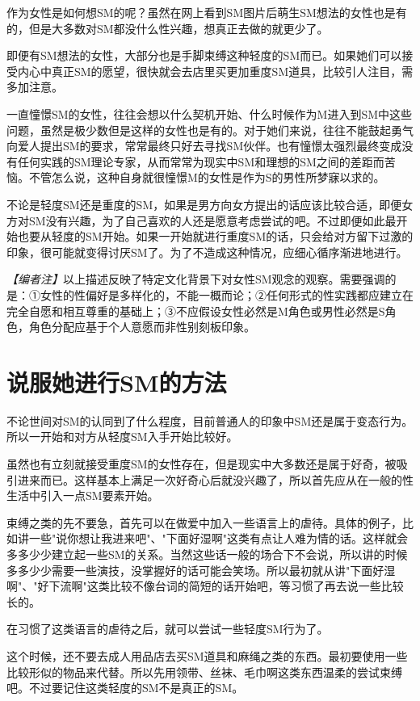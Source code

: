 \documentclass[12pt,UTF8]{ctexbook}
\begin{document}
作为女性是如何想SM的呢？虽然在网上看到SM图片后萌生SM想法的女性也是有的，但是大多数对SM都没什么性兴趣，想真正去做的就更少了。

即便有SM想法的女性，大部分也是手脚束缚这种轻度的SM而已。如果她们可以接受内心中真正SM的愿望，很快就会去店里买更加重度SM道具，比较引人注目，需多加注意。

一直憧憬SM的女性，往往会想以什么契机开始、什么时候作为M进入到SM中这些问题，虽然是极少数但是这样的女性也是有的。对于她们来说，往往不能鼓起勇气向爱人提出SM的要求，常常最终只好去寻找SM伙伴。也有憧憬太强烈最终变成没有任何实践的SM理论专家，从而常常为现实中SM和理想的SM之间的差距而苦恼。不管怎么说，这种自身就很憧憬M的女性是作为S的男性所梦寐以求的。

不论是轻度SM还是重度的SM，如果是男方向女方提出的话应该比较合适，即便女方对SM没有兴趣，为了自己喜欢的人还是愿意考虑尝试的吧。不过即便如此最开始也要从轻度的SM开始。如果一开始就进行重度SM的话，只会给对方留下过激的印象，很可能就变得讨厌SM了。为了不造成这种情况，应细心循序渐进地进行。

\textit{【编者注】}以上描述反映了特定文化背景下对女性SM观念的观察。需要强调的是：①女性的性偏好是多样化的，不能一概而论；②任何形式的性实践都应建立在完全自愿和相互尊重的基础上；③不应假设女性必然是M角色或男性必然是S角色，角色分配应基于个人意愿而非性别刻板印象。

\section{说服她进行SM的方法}

不论世间对SM的认同到了什么程度，目前普通人的印象中SM还是属于变态行为。所以一开始和对方从轻度SM入手开始比较好。

虽然也有立刻就接受重度SM的女性存在，但是现实中大多数还是属于好奇，被吸引进来而已。这样基本上满足一次好奇心后就没兴趣了，所以首先应从在一般的性生活中引入一点SM要素开始。

束缚之类的先不要急，首先可以在做爱中加入一些语言上的虐待。具体的例子，比如讲一些"说你想让我进来吧"、"下面好湿啊"这类有点让人难为情的话。这样就会多多少少建立起一些SM的关系。当然这些话一般的场合下不会说，所以讲的时候多多少少需要一些演技，没掌握好的话可能会笑场。所以最初就从讲"下面好湿啊"、"好下流啊"这类比较不像台词的简短的话开始吧，等习惯了再去说一些比较长的。

在习惯了这类语言的虐待之后，就可以尝试一些轻度SM行为了。

这个时候，还不要去成人用品店去买SM道具和麻绳之类的东西。最初要使用一些比较形似的物品来代替。所以先用领带、丝袜、毛巾啊这类东西温柔的尝试束缚吧。不过要记住这类轻度的SM不是真正的SM。
\end{document}

